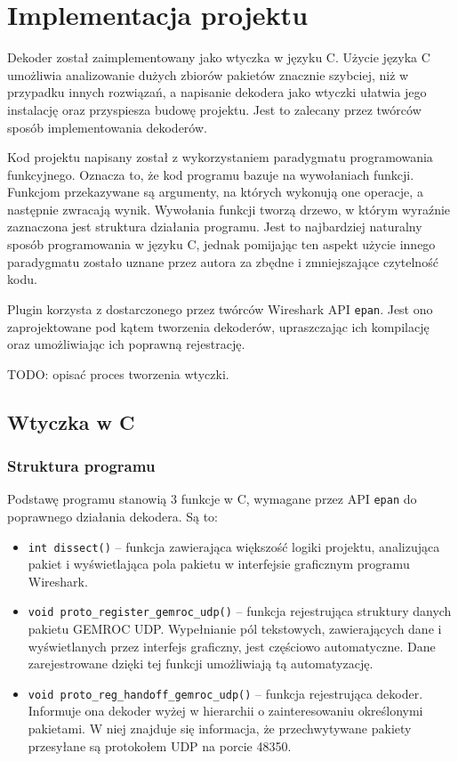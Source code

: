 \documentclass[a4paper, 12pt, twoside, openright]{article}
\begin{document}
	\indent\par


\newpage
\section{Implementacja projektu}

	Dekoder został zaimplementowany jako wtyczka w języku C. Użycie języka C umożliwia analizowanie dużych zbiorów pakietów znacznie
	szybciej, niż w przypadku innych rozwiązań, a napisanie dekodera jako wtyczki ułatwia jego instalację oraz przyspiesza budowę projektu.
	Jest to zalecany przez twórców sposób implementowania dekoderów.

	Kod projektu napisany został z wykorzystaniem paradygmatu programowania funkcyjnego. Oznacza to, że kod programu bazuje na wywołaniach
	funkcji. Funkcjom przekazywane są argumenty, na których wykonują one operacje, a następnie zwracają wynik. Wywołania funkcji tworzą drzewo,
	w którym wyraźnie zaznaczona jest struktura działania programu. Jest to najbardziej naturalny sposób programowania w języku C,
	jednak pomijając ten aspekt użycie innego paradygmatu zostało uznane przez autora za zbędne i zmniejszające czytelność kodu.

	Plugin korzysta z dostarczonego przez twórców Wireshark API \texttt{epan}. Jest ono zaprojektowane pod kątem tworzenia dekoderów,
	upraszczając ich kompilację oraz umożliwiając ich poprawną rejestrację.

	TODO: opisać proces tworzenia wtyczki.

	\subsection{Wtyczka w C}
	\indent\par
	\subsubsection{Struktura programu}

	\indent\par
	Podstawę programu stanowią 3 funkcje w C, wymagane przez API \texttt{epan} do poprawnego działania dekodera. Są to:
	\begin{itemize}
		\item \texttt{int dissect()} -- funkcja zawierająca większość logiki projektu, analizująca pakiet i wyświetlająca
			pola pakietu w interfejsie graficznym programu Wireshark.
		\item \texttt{void proto\_register\_gemroc\_udp()} -- funkcja rejestrująca struktury danych pakietu GEMROC UDP.
			Wypełnianie pól tekstowych, zawierających dane i wyświetlanych przez interfejs graficzny, jest częściowo
			automatyczne. Dane zarejestrowane dzięki tej funkcji umożliwiają tą automatyzację.
		\item \texttt{void proto\_reg\_handoff\_gemroc\_udp()} -- funkcja rejestrująca dekoder. Informuje ona dekoder wyżej
			w hierarchii o zainteresowaniu określonymi pakietami. W niej znajduje się informacja, że przechwytywane pakiety
			przesyłane są protokołem UDP na porcie 48350.
	\end{itemize}
\end{document}
